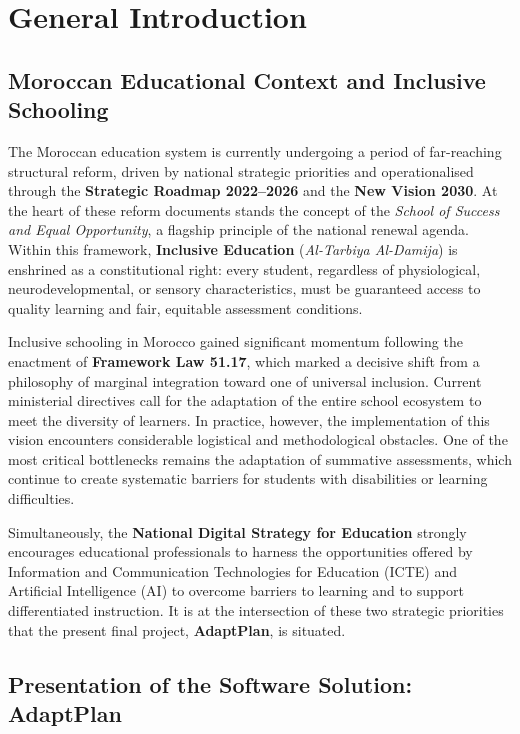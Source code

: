 \documentclass[12pt,a4paper]{report}
\begin{document}
\chapter{General Introduction}

\section{Moroccan Educational Context and Inclusive Schooling}

The Moroccan education system is currently undergoing a period of far-reaching structural reform, driven by national strategic priorities and operationalised through the \textbf{Strategic Roadmap 2022--2026} and the \textbf{New Vision 2030}. At the heart of these reform documents stands the concept of the \textit{School of Success and Equal Opportunity}, a flagship principle of the national renewal agenda. Within this framework, \textbf{Inclusive Education} (\textit{Al-Tarbiya Al-Damija}) is enshrined as a constitutional right: every student, regardless of physiological, neurodevelopmental, or sensory characteristics, must be guaranteed access to quality learning and fair, equitable assessment conditions.

Inclusive schooling in Morocco gained significant momentum following the enactment of \textbf{Framework Law 51.17}, which marked a decisive shift from a philosophy of marginal integration toward one of universal inclusion. Current ministerial directives call for the adaptation of the entire school ecosystem to meet the diversity of learners. In practice, however, the implementation of this vision encounters considerable logistical and methodological obstacles. One of the most critical bottlenecks remains the adaptation of summative assessments, which continue to create systematic barriers for students with disabilities or learning difficulties.

Simultaneously, the \textbf{National Digital Strategy for Education} strongly encourages educational professionals to harness the opportunities offered by Information and Communication Technologies for Education (ICTE) and Artificial Intelligence (AI) to overcome barriers to learning and to support differentiated instruction. It is at the intersection of these two strategic priorities that the present final project, \textbf{AdaptPlan}, is situated.

\section{Presentation of the Software Solution: AdaptPlan}
\end{document}
